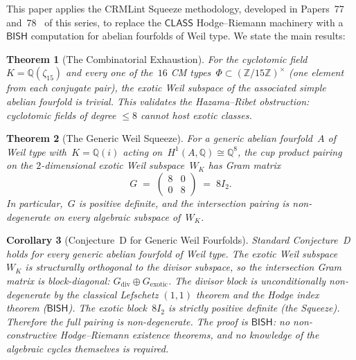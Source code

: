\documentclass[11pt]{article}
\theoremstyle{plain}
\newtheorem{theorem}{Theorem}[section]
\newtheorem{corollary}[theorem]{Corollary}
\theoremstyle{definition}
\theoremstyle{remark}
\newcommand{\Z}{\mathbb{Z}}
\newcommand{\Q}{\mathbb{Q}}
\newcommand{\BISH}{\mathsf{BISH}}
\newcommand{\CLASS}{\mathsf{CLASS}}
\begin{document}
This paper applies the CRMLint Squeeze methodology, developed in
Papers~77~\cite{paper77} and~78~\cite{paper78} of this series, to replace
the $\CLASS$ Hodge--Riemann machinery with a $\BISH$ computation for
abelian fourfolds of Weil type.  We state the main results:

\begin{theorem}[The Combinatorial Exhaustion]
\label{thm:A}
For the cyclotomic field~$K = \Q(\zeta_{15})$ and every one of the~$16$ CM
types~$\Phi \subset (\Z/15\Z)^\times$ (one element from each conjugate pair),
the exotic Weil subspace of the associated simple abelian fourfold is trivial.
This validates the Hazama--Ribet obstruction: cyclotomic fields of degree
$\leq 8$ cannot host exotic classes.
\end{theorem}

\begin{theorem}[The Generic Weil Squeeze]
\label{thm:B}
For a generic abelian fourfold~$A$ of Weil type with~$K = \Q(i)$ acting
on~$H^1(A,\Q) \cong \Q^8$, the cup product pairing on the $2$-dimensional
exotic Weil subspace~$W_K$ has Gram matrix
\[
  G \;=\; \begin{pmatrix} 8 & 0 \\ 0 & 8 \end{pmatrix} \;=\; 8I_2.
\]
In particular,~$G$ is positive definite, and the intersection pairing is
non-degenerate on every algebraic subspace of~$W_K$.
\end{theorem}

\begin{corollary}[Conjecture~D for Generic Weil Fourfolds]
\label{cor:C}
Standard Conjecture~D holds for every generic abelian fourfold of Weil type.
The exotic Weil subspace~$W_K$ is structurally orthogonal to the divisor
subspace, so the intersection Gram matrix is block-diagonal:
$G_{\mathrm{div}} \oplus G_{\mathrm{exotic}}$.  The divisor block is
unconditionally non-degenerate by the classical Lefschetz $(1,1)$ theorem and
the Hodge index theorem ($\BISH$).  The exotic block~$8I_2$ is strictly
positive definite (the Squeeze).  Therefore the full pairing is
non-degenerate.  The proof is $\BISH$: no non-constructive Hodge--Riemann existence theorems,
and no knowledge of the algebraic cycles themselves is required.
\end{corollary}
\end{document}
